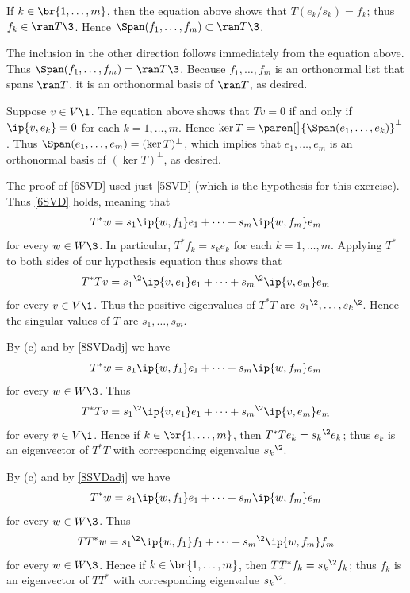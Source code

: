 \begin{Solution}
\begin{subtheorem}
\item
If $k \in \br{1, \ldots, m}$, then the equation above shows that $T(e_k/s_k) = f_k$; thus $f_k \in \ran T\3$. Hence
$\Span(f_1, \ldots, f_m) \subset \ran T\3$.

The inclusion in the other direction follows immediately from the equation above. Thus
$\Span(f_1, \ldots, f_m) = \ran T\3$. Because $f_1, \ldots, f_m$ is an orthonormal list that spans $\ran T$, it is an orthonormal basis of
$\ran T$, as desired.

\item
Suppose $v \in V\1$. The equation above shows that $Tv = 0$ if and only if $\ip{v, e_k} = 0$ for each $k = 1, \ldots, m$. Hence
$\ker T = \paren[\big]{\Span(e_1, \ldots, e_k)}^\perp$. Thus $\Span(e_1, \ldots, e_m) = (\ker T)^\perp$, which implies that
$e_1, \dots, e_m$  is an orthonormal basis of $(\ker T)^\perp$, as desired.

\item
The proof of \ref{6SVD} used just \ref{5SVD} (which is the hypothesis  for this exercise). Thus \ref{6SVD} holds, meaning that
\[
T^*w = s_1 \ip{w, f_1} e_1 + \dots + s_m \ip{w, f_m} e_m
\]
for every $w \in W\3$. In particular, $T^* \! f_k = s_k e_k$ for each $k = 1, \ldots, m$. Applying $T^*$ to both sides of our hypothesis equation thus shows that
\[
T^*Tv = {s_1}^{\2} \ip{v, e_1} e_1 + \dots + {s_m}^{\2} \ip{v, e_m} e_m
\]
for every $v \in V\1$. Thus the positive eigenvalues of $T^* T$ are ${s_1}^{\2}, \ldots, {s_k}^{\2}$. Hence the singular values of $T$ are
$s_1, \ldots, s_m$.

\item
By (c) and by \ref{8SVDadj} we have
\[
T^*w = s_1 \ip{w, f_1} e_1 + \dots + s_m \ip{w, f_m} e_m
\]
for every $w \in W\3$. Thus
\[
T^*T v = {s_1}^{\2} \ip{v, e_1} e_1 + \dots + {s_m}^{\2} \ip{v, e_m} e_m
\]
for every $v \in V\1$. Hence if $k \in \br{1, \ldots, m}$, then $T^*Te_k = {s_k}^{\2} e_k$; thus $e_k$ is an eigenvector of $T^*T$ with corresponding eigenvalue ${s_k}^{\2}$.

\item
By (c) and by \ref{8SVDadj} we have
\[
T^*w = s_1 \ip{w, f_1} e_1 + \dots + s_m \ip{w, f_m} e_m
\]
for every $w \in W\3$. Thus
\[
TT^* w = {s_1}^{\2} \ip{w, f_1} f_1 + \dots + {s_m}^{\2} \ip{w, f_m} f_m
\]
for every $w \in W\3$. Hence if $k \in \br{1, \ldots, m}$, then $TT^*f_k = {s_k}^{\2} f_k$; thus $f_k$ is an eigenvector of $TT^*$ with corresponding eigenvalue ${s_k}^{\2}$.
\end{subtheorem}
\end{Solution}

